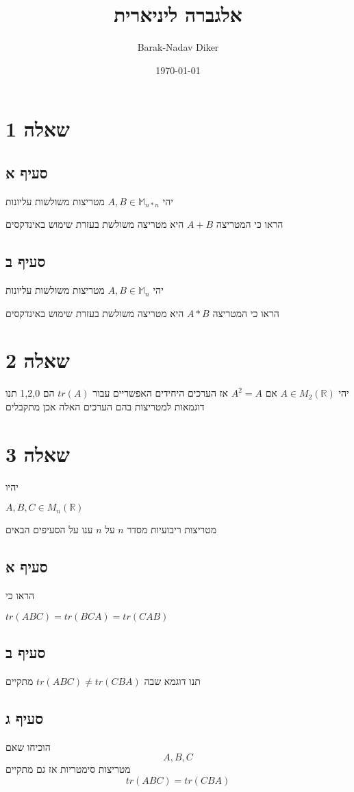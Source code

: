 \documentclass[11pt]{article}
\author{Barak-Nadav Diker}
\date{\today}
\title{אלגברה ליניארית}
\begin{document}
\maketitle
\tableofcontents

\newpage
\section*{שאלה 1}
\label{sec:org7866470}
\subsection*{סעיף א}
\label{sec:org5f999d3}
יהי
\(A,B \in \mathbb{M} _{n*n}\)
מטריצות משולשות עליונות

הראו כי המטריצה
\(A+B\)
היא מטריצה משולשת
בעזרת שימוש באינדקסים
\subsection*{סעיף ב}
\label{sec:org8d98963}
יהי
\(A,B \in \mathbb{M} _{n}\)
מטריצות משולשות עליונות

הראו כי המטריצה
\(A*B\)
היא מטריצה משולשת
בעזרת שימוש באינדקסים
\section*{שאלה 2}
\label{sec:orgb831724}
יהי
\(A\in M_{2} (\mathbb{R})\)
אם
\(A^2 = A\)
אז הערכים היחידים האפשריים עבור
\(tr(A)\)
הם
1,2,0
תנו דוגמאות למטריצות בהם הערכים האלה אכן מתקבלים
\section*{שאלה 3}
\label{sec:orgdc06d87}
יהיו

\(A,B,C \in M_n(\mathbb{R})\)

מטריצות ריבועיות מסדר
\(n\)
על
\(n\)
ענו על הסעיפים הבאים
\subsection*{סעיף א}
\label{sec:org000365c}
הראו כי

\(tr(ABC) = tr(BCA) = tr(CAB)\)
\subsection*{סעיף ב}
\label{sec:orga24c9fc}
תנו דוגמא שבה
\(tr(ABC) \neq tr(CBA)\)
מתקיים
\subsection*{סעיף ג}
\label{sec:orgd6a94a3}
הוכיחו שאם
\[A,B,C\]
מטריצות סימטריות אז גם
מתקיים
\[ tr(ABC) = tr(CBA) \]
\end{document}
